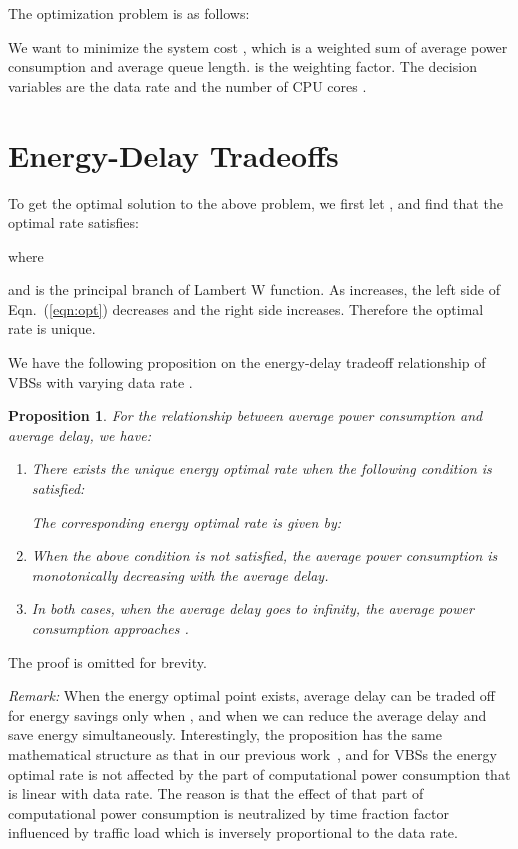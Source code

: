 \documentclass[conference]{IEEEtran}
\newtheorem{proposition}{Proposition}
\begin{document}
The optimization problem is as follows:

We want to minimize the system cost , which is a weighted sum of average power
consumption and average queue length.  is the weighting factor.
The decision variables are the data rate  and the number of CPU cores
.

\section{Energy-Delay Tradeoffs}
\label{sec:edt}

To get the optimal solution to the above problem, we first let
, and find that
the optimal rate  satisfies:

where

and  is the principal branch of Lambert W function.
As  increases,
the left side of Eqn.~(\ref{eqn:opt}) decreases and the right side increases.
Therefore the optimal rate  is unique.

We have the following proposition on the energy-delay tradeoff relationship
of VBSs with varying data rate .
\begin{proposition}
  For the relationship between average power consumption and average
  delay, we have:
  \begin{enumerate}
    \item There exists the unique energy optimal rate  when the
  following condition is satisfied:
  
  \label{eqn:proposition1}
  The corresponding energy optimal rate is given by:

\item  When the above condition is not satisfied,
  the average power consumption is
  monotonically decreasing with the average delay.
\item In both cases, when the average delay goes to infinity, the average
  power consumption approaches  .
  \end{enumerate}
\end{proposition}

The proof is omitted for brevity.

\emph{Remark:}
When the energy optimal point exists, average delay can be traded off
for energy savings only when , and when 
we can reduce the average delay and save energy simultaneously.
Interestingly, the proposition has the same mathematical structure as that in
our previous work~\cite{wu2013traffic}, and for VBSs
the energy optimal rate is not affected by the part of computational power
consumption that is linear with data rate. The reason is that the effect of
that part of
computational power consumption is neutralized by time fraction factor
influenced by traffic load which is inversely proportional to the data rate.
\end{document}
